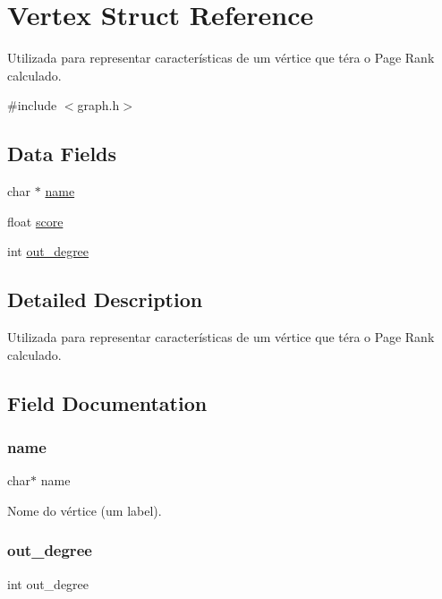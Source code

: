 \hypertarget{struct_vertex}{}\section{Vertex Struct Reference}
\label{struct_vertex}


Utilizada para representar características de um vértice que téra o Page Rank calculado.  




{\ttfamily \#include $<$graph.\+h$>$}

\subsection*{Data Fields}
\begin{DoxyCompactItemize}
\item 
char $\ast$ \mbox{\hyperlink{struct_vertex_a5ac083a645d964373f022d03df4849c8}{name}}
\item 
float \mbox{\hyperlink{struct_vertex_a8c5cd9b525ee73a24b1d9d8e34982d1c}{score}}
\item 
int \mbox{\hyperlink{struct_vertex_a2aef63ce88b223b06ef89def4b78b51f}{out\+\_\+degree}}
\end{DoxyCompactItemize}


\subsection{Detailed Description}
Utilizada para representar características de um vértice que téra o Page Rank calculado. 

\subsection{Field Documentation}
\mbox{\label{struct_vertex_a5ac083a645d964373f022d03df4849c8}} 
\subsubsection{\texorpdfstring{name}{name}}
{\footnotesize\ttfamily char$\ast$ name}

Nome do vértice (um label). \mbox{\label{struct_vertex_a2aef63ce88b223b06ef89def4b78b51f}} 
\subsubsection{\texorpdfstring{out\_degree}{out\_degree}}
{\footnotesize\ttfamily int out\+\_\+degree}

